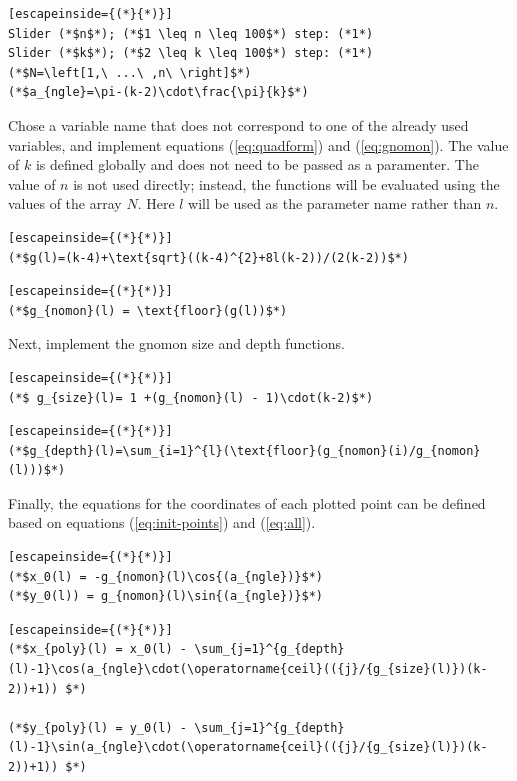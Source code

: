 \documentclass[notitlepage]{report}
\begin{document}
\begin{lstlisting}[escapeinside={(*}{*)}]
Slider (*$n$*); (*$1 \leq n \leq 100$*) step: (*1*)
Slider (*$k$*); (*$2 \leq k \leq 100$*) step: (*1*)
(*$N=\left[1,\ ...\ ,n\ \right]$*)
(*$a_{ngle}=\pi-(k-2)\cdot\frac{\pi}{k}$*)
\end{lstlisting}

Chose a variable name that does not correspond to one of the already used variables, and implement equations (\ref{eq:quadform}) and (\ref{eq:gnomon}). The value of $k$ is defined globally and does not need to be passed as a paramenter. The value of $n$ is not used directly; instead, the functions will be evaluated using the values of the array $N$. Here $l$ will be used as the parameter name rather than $n$. 

\begin{lstlisting}[escapeinside={(*}{*)}]
(*$g(l)=(k-4)+\text{sqrt}((k-4)^{2}+8l(k-2))/(2(k-2))$*)
\end{lstlisting}

\begin{lstlisting}[escapeinside={(*}{*)}]
(*$g_{nomon}(l) = \text{floor}(g(l))$*)  
\end{lstlisting}

Next, implement the gnomon size and depth functions.

\begin{lstlisting}[escapeinside={(*}{*)}]
(*$ g_{size}(l)= 1 +(g_{nomon}(l) - 1)\cdot(k-2)$*)
\end{lstlisting}

\begin{lstlisting}[escapeinside={(*}{*)}]
(*$g_{depth}(l)=\sum_{i=1}^{l}(\text{floor}(g_{nomon}(i)/g_{nomon}(l)))$*)
\end{lstlisting}

Finally, the equations for the coordinates of each plotted point can be defined based on equations (\ref{eq:init-points}) and (\ref{eq:all}).


\begin{lstlisting}[escapeinside={(*}{*)}]
(*$x_0(l) = -g_{nomon}(l)\cos{(a_{ngle})}$*)
(*$y_0(l)) = g_{nomon}(l)\sin{(a_{ngle})}$*)
\end{lstlisting}


\begin{lstlisting}[escapeinside={(*}{*)}]
(*$x_{poly}(l) = x_0(l) - \sum_{j=1}^{g_{depth}(l)-1}\cos(a_{ngle}\cdot(\operatorname{ceil}(({j}/{g_{size}(l)})(k-2))+1)) $*)

(*$y_{poly}(l) = y_0(l) - \sum_{j=1}^{g_{depth}(l)-1}\sin(a_{ngle}\cdot(\operatorname{ceil}(({j}/{g_{size}(l)})(k-2))+1)) $*)
\end{lstlisting}
\end{document}
